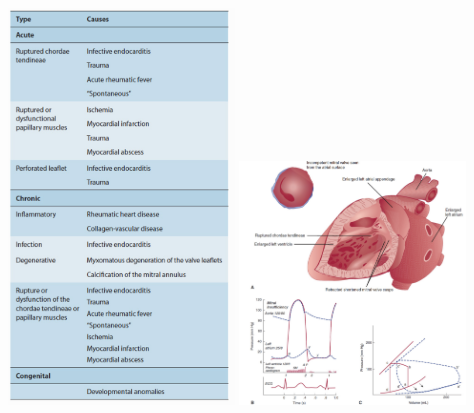 \documentclass[11pt]{article}
\begin{document}
\begin{itemize}
\includegraphics[width=0.45\textwidth]{images/causes_of_mitral_insufficiency.png}
\includegraphics[width=0.45\textwidth]{images/characteristics_of_mitral_insufficiency.png}

\end{itemize}
\end{document}
